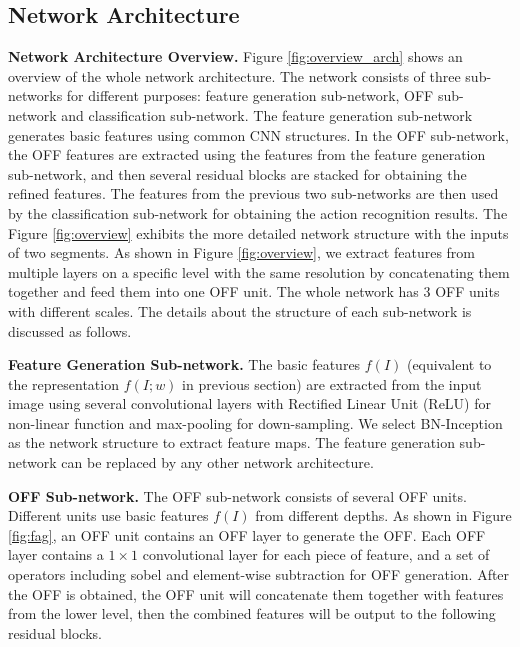 \documentclass[10pt,twocolumn,letterpaper]{article}
\begin{document}
\subsection{Network Architecture}

 \textbf{Network Architecture Overview.} Figure \ref{fig:overview_arch} shows an overview of the whole network architecture. 
 The network consists of three sub-networks for different purposes: feature generation sub-network, OFF sub-network and classification sub-network. The feature generation sub-network generates basic features using common CNN structures. In the OFF sub-network, the OFF features are extracted using the features from the feature generation sub-network, and then several residual blocks are stacked for obtaining the refined features. The features from the previous two sub-networks are then used by the classification sub-network for obtaining the action recognition results. The Figure \ref{fig:overview} exhibits the more detailed network structure with the inputs of two segments. 
 As shown in Figure \ref{fig:overview}, we extract features from multiple layers on a specific level with the same resolution by concatenating them together and feed them into one OFF unit. The whole network has 3 OFF units with different scales. The details about the structure of each sub-network is discussed as follows.
 
 \vspace{-3px}
 \textbf{Feature Generation Sub-network.} The basic features $f(I)$ (equivalent to the representation $f(I;w)$ in previous section) are extracted from the input image using several convolutional layers with Rectified Linear Unit (ReLU) for non-linear function and max-pooling for down-sampling. We select BN-Inception  \cite{Szegedycvpr2015googlenet} as the network structure to extract feature maps. The feature generation sub-network can be replaced by any other network architecture.

  \textbf{OFF Sub-network.} The OFF sub-network consists of several OFF units. Different units use basic features $f(I)$ from different depths. As shown in Figure \ref{fig:fag}, an OFF unit contains an OFF layer to generate the OFF. Each OFF layer contains a $1\times1$ convolutional layer for each piece of feature, and a set of operators including sobel and element-wise subtraction for OFF generation. After the OFF is obtained, the OFF unit will concatenate them together with features from the lower level, then the combined features will be output to the following residual blocks.
 
\end{document}
